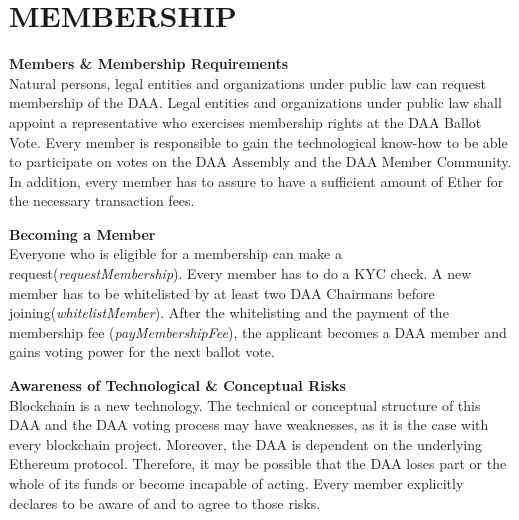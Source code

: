 \section{MEMBERSHIP}\label{sec:membership}

\item \textbf{Members \& Membership Requirements} \\
Natural persons, legal entities and organizations under public law can request membership of the DAA.
Legal entities and organizations under public law shall appoint a representative who exercises membership rights at the DAA Ballot Vote.
Every member is responsible to gain the technological know-how to be able to participate on votes on the DAA Assembly and the DAA Member Community.
In addition, every member has to assure to have a sufficient amount of Ether for the necessary transaction fees.

\item \textbf{Becoming a Member} \\
Everyone who is eligible for a membership can make a request(\emph{requestMembership}).
Every member has to do a KYC check.
A new member has to be whitelisted by at least two DAA Chairmans before joining(\emph{whitelistMember}).
After the whitelisting and the payment of the membership fee (\emph{payMembershipFee}), the applicant becomes a DAA member and gains voting power for the next ballot vote.

\item \textbf{Awareness of Technological \& Conceptual Risks} \\
Blockchain is a new technology.
The technical or conceptual structure of this DAA and the DAA voting process may have weaknesses, as it is the case with every blockchain project.
Moreover, the DAA is dependent on the underlying Ethereum protocol.
Therefore, it may be possible that the DAA loses part or the whole of its funds or become incapable of acting.
Every member explicitly declares to be aware of and to agree to those risks.
